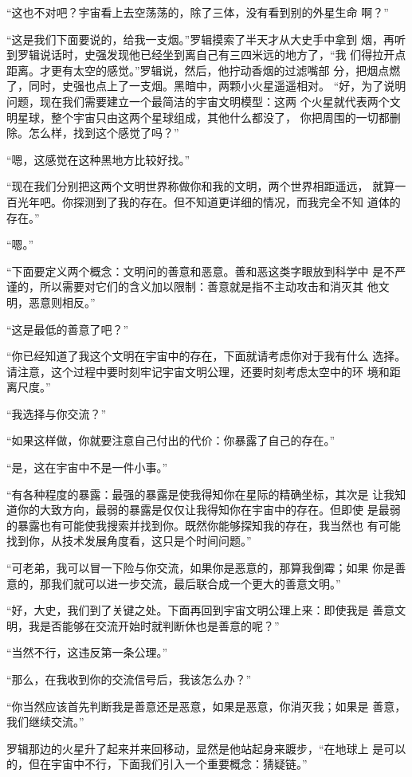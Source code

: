 “这也不对吧？宇宙看上去空荡荡的，除了三体，没有看到别的外星生命
啊？”

“这是我们下面要说的，给我一支烟。”罗辑摸索了半天才从大史手中拿到
烟，再听到罗辑说话时，史强发现他已经坐到离自己有三四米远的地方了，“我
们得拉开点距离。才更有太空的感觉。”罗辑说，然后，他拧动香烟的过滤嘴部
分，把烟点燃了，同时，史强也点上了一支烟。黑暗中，两颗小火星遥遥相对。
“好，为了说明问题，现在我们需要建立一个最简洁的宇宙文明模型：这两
个火星就代表两个文明星球，整个宇宙只由这两个星球组成，其他什么都没了，
你把周围的一切都删除。怎么样，找到这个感觉了吗？”

“嗯，这感觉在这种黑地方比较好找。”

“现在我们分别把这两个文明世界称做你和我的文明，两个世界相距遥远，
就算一百光年吧。你探测到了我的存在。但不知道更详细的情况，而我完全不知
道体的存在。”

“嗯。”

“下面要定义两个概念：文明问的善意和恶意。善和恶这类字眼放到科学中
是不严谨的，所以需要对它们的含义加以限制：善意就是指不主动攻击和消灭其
他文明，恶意则相反。”

“这是最低的善意了吧？”

“你已经知道了我这个文明在宇宙中的存在，下面就请考虑你对于我有什么
选择。请注意，这个过程中要时刻牢记宇宙文明公理，还要时刻考虑太空中的环
境和距离尺度。”

“我选择与你交流？”

“如果这样做，你就要注意自己付出的代价：你暴露了自己的存在。”

“是，这在宇宙中不是一件小事。”

“有各种程度的暴露：最强的暴露是使我得知你在星际的精确坐标，其次是
让我知道你的大致方向，最弱的暴露是仅仅让我得知你在宇宙中的存在。但即使
是最弱的暴露也有可能使我搜索并找到你。既然你能够探知我的存在，我当然也
有可能找到你，从技术发展角度看，这只是个时间问题。”

“可老弟，我可以冒一下险与你交流，如果你是恶意的，那算我倒霉；如果
你是善意的，那我们就可以进一步交流，最后联合成一个更大的善意文明。”

“好，大史，我们到了关键之处。下面再回到宇宙文明公理上来：即使我是
善意文明，我是否能够在交流开始时就判断休也是善意的呢？”

“当然不行，这违反第一条公理。”

“那么，在我收到你的交流信号后，我该怎么办？”

“你当然应该首先判断我是善意还是恶意，如果是恶意，你消灭我；如果是
善意，我们继续交流。”

罗辑那边的火星升了起来并来回移动，显然是他站起身来踱步，“在地球上
是可以的，但在宇宙中不行，下面我们引入一个重要概念：猜疑链。”

